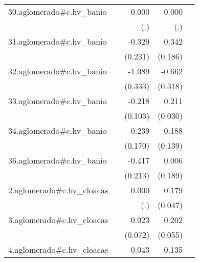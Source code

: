 {\begin{longtable}{l*{4}{D{.}{.}{-1}}}
\addlinespace
30.aglomerado#c.hv\_banio&                     &       0.000         &       0.000         &                     \\
            &                     &         (.)         &         (.)         &                     \\
\addlinespace
31.aglomerado#c.hv\_banio&                     &      -0.329         &       0.342         &                     \\
            &                     &     (0.231)         &     (0.186)         &                     \\
\addlinespace
32.aglomerado#c.hv\_banio&                     &      -1.089\sym{**} &      -0.662\sym{*}  &                     \\
            &                     &     (0.333)         &     (0.318)         &                     \\
\addlinespace
33.aglomerado#c.hv\_banio&                     &      -0.218\sym{*}  &       0.211\sym{***}&                     \\
            &                     &     (0.103)         &     (0.030)         &                     \\
\addlinespace
34.aglomerado#c.hv\_banio&                     &      -0.239         &       0.188         &                     \\
            &                     &     (0.170)         &     (0.139)         &                     \\
\addlinespace
36.aglomerado#c.hv\_banio&                     &      -0.417         &       0.006         &                     \\
            &                     &     (0.213)         &     (0.189)         &                     \\
\addlinespace
2.aglomerado#c.hv\_cloacas&                     &       0.000         &       0.179\sym{***}&                     \\
            &                     &         (.)         &     (0.047)         &                     \\
\addlinespace
3.aglomerado#c.hv\_cloacas&                     &       0.023         &       0.202\sym{***}&                     \\
            &                     &     (0.072)         &     (0.055)         &                     \\
\addlinespace
4.aglomerado#c.hv\_cloacas&                     &      -0.043         &       0.135\sym{***}&                     \\

\end{longtable}}
